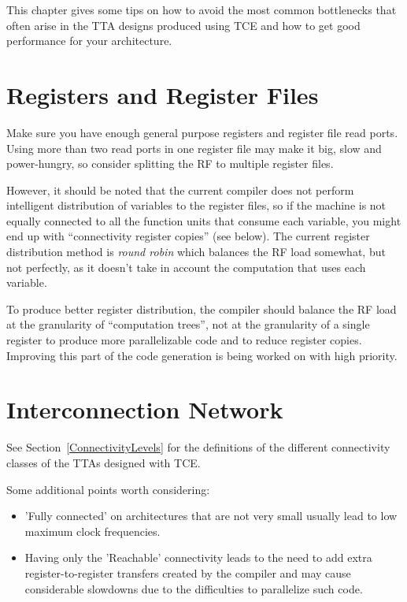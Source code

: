 \documentclass[a4paper,twoside]{tceusermanual}
\begin{document}
This chapter gives some tips on how to avoid the most common bottlenecks that
often arise in the TTA designs produced using TCE and how to get good 
performance for your architecture.

\section{Registers and Register Files}

Make sure you have enough general purpose registers and register file 
read ports. Using more than two read ports in one register file may make it 
big, slow and power-hungry, so consider splitting the RF to multiple register files.

However, it should be noted that the current compiler does not perform
intelligent distribution of variables to the register files, so if the machine
is not equally connected to all the function units that consume each variable,
you might end up with ``connectivity register copies'' (see below). The current 
register distribution method is \textit{round robin} which balances the RF load somewhat,
but not perfectly, as it doesn't take in account the computation that uses each 
variable. 

To produce better register distribution, the compiler should balance the RF load at 
the granularity of ``computation trees'', not at the granularity of a single register
to produce more parallelizable code and to reduce register copies. Improving this 
part of the code generation is being worked on with high priority.

\section{Interconnection Network}

See Section~\ref{ConnectivityLevels} for the definitions of the different
connectivity classes of the TTAs designed with TCE.

Some additional points worth considering:

\begin{itemize}
\item
'Fully connected' on architectures that are not very small usually lead to 
low maximum clock frequencies.

\item
Having only the 'Reachable' connectivity leads to the need to add extra
register-to-register transfers created by the compiler and may cause
considerable slowdowns due to the difficulties to parallelize such code.

\end{itemize}
\end{document}
